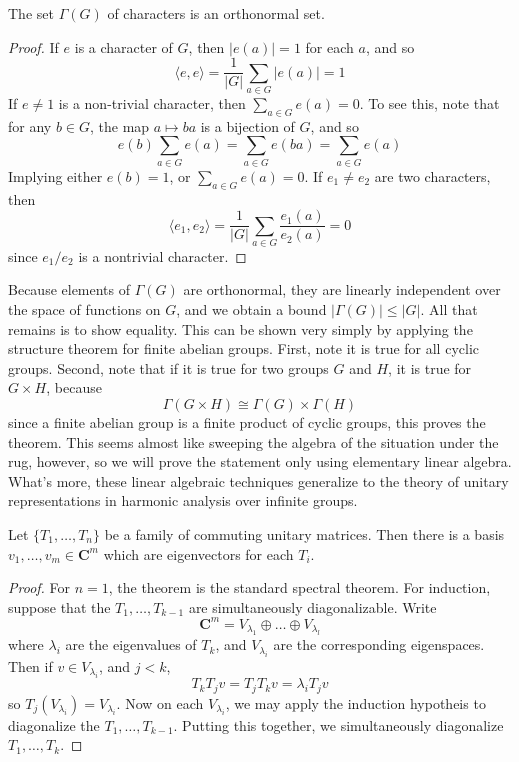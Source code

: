 \begin{theorem}
    The set $\Gamma(G)$ of characters is an orthonormal set.
\end{theorem}
\begin{proof}
    If $e$ is a character of $G$, then $|e(a)| = 1$ for each $a$, and so
    \[ \langle e, e \rangle = \frac{1}{|G|} \sum_{a \in G} |e(a)| = 1 \]
    If $e \neq 1$ is a non-trivial character, then $\sum_{a \in G} e(a) = 0$. To see this, note that for any $b \in G$, the map $a \mapsto ba$ is a bijection of $G$, and so
    \[ e(b) \sum_{a \in G} e(a) = \sum_{a \in G} e(ba) = \sum_{a \in G} e(a) \]
    Implying either $e(b) = 1$, or $\sum_{a \in G} e(a) = 0$. If $e_1 \neq e_2$ are two characters, then
    \[ \langle e_1, e_2 \rangle = \frac{1}{|G|} \sum_{a \in G} \frac{e_1(a)}{e_2(a)} = 0 \]
    since $e_1/e_2$ is a nontrivial character.
\end{proof}

Because elements of $\Gamma(G)$ are orthonormal, they are linearly independent over the space of functions on $G$, and we obtain a bound $|\Gamma(G)| \leq |G|$. All that remains is to show equality. This can be shown very simply by applying the structure theorem for finite abelian groups. First, note it is true for all cyclic groups. Second, note that if it is true for two groups $G$ and $H$, it is true for $G \times H$, because
%
\[ \Gamma(G \times H) \cong \Gamma(G) \times \Gamma(H) \]
%
since a finite abelian group is a finite product of cyclic groups, this proves the theorem. This seems almost like sweeping the algebra of the situation under the rug, however, so we will prove the statement only using elementary linear algebra. What's more, these linear algebraic techniques generalize to the theory of unitary representations in harmonic analysis over infinite groups.

\begin{theorem}
    Let $\{ T_1, \dots, T_n \}$ be a family of commuting unitary matrices. Then there is a basis $v_1, \dots, v_m \in \mathbf{C}^m$ which are eigenvectors for each $T_i$.
\end{theorem}
\begin{proof}
    For $n = 1$, the theorem is the standard spectral theorem. For induction, suppose that the $T_1, \dots, T_{k-1}$ are simultaneously diagonalizable. Write
    \[ \mathbf{C}^m = V_{\lambda_1} \oplus \dots \oplus V_{\lambda_l} \]
    where $\lambda_i$ are the eigenvalues of $T_k$, and $V_{\lambda_i}$ are the corresponding eigenspaces. Then if $v \in V_{\lambda_i}$, and $j < k$,
    \[ T_k T_j v = T_j T_k v = \lambda_i T_j v \]
    so $T_j(V_{\lambda_i}) = V_{\lambda_i}$. Now on each $V_{\lambda_i}$, we may apply the induction hypotheis to diagonalize the $T_1, \dots, T_{k-1}$. Putting this together, we simultaneously diagonalize $T_1, \dots, T_k$.
\end{proof}

